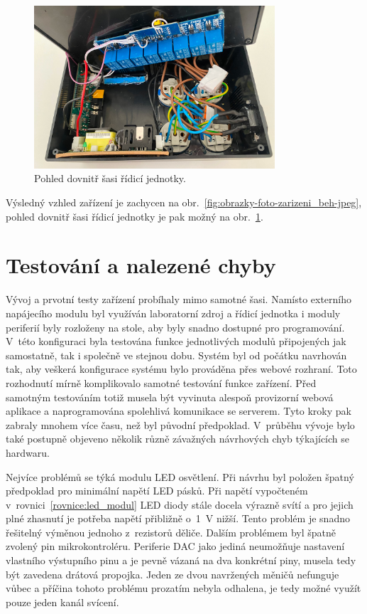 \begin{figure}[h!]
    \centering
    \includegraphics[width=0.8\textwidth]{obrazky/foto/ulozeni.jpeg}
    \caption{Pohled dovnitř šasi řídicí jednotky.}
    \label{fig:obrazky-foto-ulozeni-jpeg}
\end{figure}


Výsledný vzhled zařízení je zachycen na obr.~\ref{fig:obrazky-foto-zarizeni_beh-jpeg}, pohled dovnitř šasi řídicí jednotky je pak možný na obr.~\ref{fig:obrazky-foto-ulozeni-jpeg}.

\section{Testování a nalezené chyby}
    Vývoj a prvotní testy zařízení probíhaly mimo samotné šasi. Namísto externího napájecího modulu byl využíván laboratorní zdroj a řídicí jednotka i moduly periferií byly rozloženy na stole, aby byly snadno dostupné pro programování. V~této konfiguraci byla testována funkce jednotlivých modulů připojených jak samostatně, tak i společně ve stejnou dobu. Systém byl od počátku navrhován tak, aby veškerá konfigurace systému bylo prováděna přes webové rozhraní. Toto rozhodnutí mírně komplikovalo samotné testování funkce zařízení. Před samotným testováním totiž musela být vyvinuta alespoň provizorní webová aplikace a naprogramována spolehlivá komunikace se serverem. Tyto kroky pak zabraly mnohem více času, než byl původní předpoklad. V~průběhu vývoje bylo také postupně objeveno několik různě závažných návrhových chyb týkajících se hardwaru. 
    
    Nejvíce problémů se týká modulu LED osvětlení. Při návrhu byl položen špatný předpoklad pro minimální napětí LED pásků. Při napětí vypočteném v~rovnici~\ref{rovnice:led_modul} LED diody stále docela výrazně svítí a pro jejich plné zhasnutí je potřeba napětí přibližně o~\qty{1}{V} nižší. Tento problém je snadno řešitelný výměnou jednoho z~rezistorů děliče. Dalším problémem byl špatně zvolený pin mikrokontroléru. Periferie DAC jako jediná neumožňuje nastavení vlastního výstupního pinu a je pevně vázaná na dva konkrétní piny, musela tedy být zavedena drátová propojka. Jeden ze dvou navržených měničů nefunguje vůbec a příčina tohoto problému prozatím nebyla odhalena, je tedy možné využít pouze jeden kanál svícení. 

